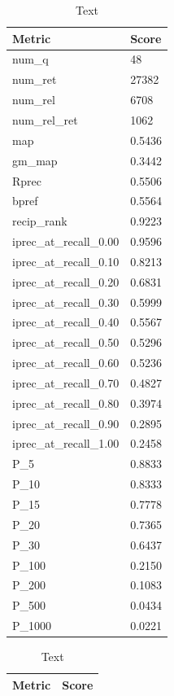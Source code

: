 \begin{table}[htb]
    \parbox{.45\linewidth}{
    \begin{tabular}{ | l | l | }
    \hline
    Metric & Score \\ \hline
	num\_q & 48 \\ \hline
	num\_ret & 27382 \\ \hline
	num\_rel & 6708 \\ \hline
	num\_rel\_ret & 1062 \\ \hline
	map & 0.5436 \\ \hline
	gm\_map & 0.3442 \\ \hline
	Rprec & 0.5506 \\ \hline
	bpref & 0.5564 \\ \hline
	recip\_rank & 0.9223 \\ \hline
	iprec\_at\_recall\_0.00 & 0.9596 \\ \hline
	iprec\_at\_recall\_0.10 & 0.8213 \\ \hline
	iprec\_at\_recall\_0.20 & 0.6831 \\ \hline
	iprec\_at\_recall\_0.30 & 0.5999 \\ \hline
	iprec\_at\_recall\_0.40 & 0.5567 \\ \hline
	iprec\_at\_recall\_0.50 & 0.5296 \\ \hline
	iprec\_at\_recall\_0.60 & 0.5236 \\ \hline
	iprec\_at\_recall\_0.70 & 0.4827 \\ \hline
	iprec\_at\_recall\_0.80 & 0.3974 \\ \hline
	iprec\_at\_recall\_0.90 & 0.2895 \\ \hline
	iprec\_at\_recall\_1.00 & 0.2458 \\ \hline
	P\_5 & 0.8833 \\ \hline
	P\_10 & 0.8333 \\ \hline
	P\_15 & 0.7778 \\ \hline
	P\_20 & 0.7365 \\ \hline
	P\_30 & 0.6437 \\ \hline
	P\_100 & 0.2150 \\ \hline
	P\_200 & 0.1083 \\ \hline
	P\_500 & 0.0434 \\ \hline
	P\_1000 & 0.0221 \\ \hline
    \end{tabular}
    \caption{Text}    
    }
    \hfill
    \parbox{.45\linewidth}{
    \begin{tabular}{ | l | l | }
    \hline
    Metric & Score \\ \hline

\end{tabular}}
\end{table}
